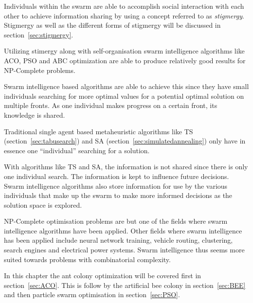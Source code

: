Individuals within the swarm are able to accomplish social interaction with each other to achieve information sharing by using a concept referred to as \emph{stigmergy}\cite{SwarmArt,CompuIntelligenceIntro,FundamentalSwarm}. Stigmergy as well as the different forms of stigmergy will be discussed in section~\ref{sec:stigmergy}.

Utilizing stimergy along with self-organisation swarm intelligence algorithms like ACO, PSO and ABC optimization are able to produce relatively good results for NP-Complete problems\cite{CompuIntelligenceIntro,FundamentalSwarm,SwarmArt}. 

Swarm intelligence based algorithms are able to achieve this since they have small individuals searching for more optimal values for a potential optimal solution on multiple fronts. As one individual makes progress on a certain front, its knowledge is shared\cite{CompuIntelligenceIntro,FundamentalSwarm}. 

Traditional single agent based metaheuristic algorithms like TS (section~\ref{sec:tabusearch}) and SA (section~\ref{sec:simulatedannealing}) only have in essence one ``individual'' searching for a solution\cite{CompuIntelligenceIntro,FundamentalSwarm}. 

With algorithms like TS and SA, the information is not shared since there is only one individual search\cite{CompuIntelligenceIntro,FundamentalSwarm,SASingleMultiObj,TSHazardous}. The information is kept to influence future decisions\cite{AIModernApproach,TabuMontemanniSmith,TabuVechicleRoutingWithTimeWindows,CurveFittingSA,EcoEquilSA}. Swarm intelligence algorithms also store information for use by the various individuals that make up the swarm to make more informed decisions as the solution space is explored\cite{CompuIntelligenceIntro,FundamentalSwarm}.

NP-Complete optimisation problems are but one of the fields where swarm intelligence algorithms have been applied. Other fields where swarm intelligence has been applied include neural network training\cite{CompuIntelligenceIntro}, vehicle routing\cite{ACOSurvey}, clustering\cite{AntSwarmClustering}, search engines and electrical power systems\cite{SAElectricPower}. Swarm intelligence thus seems more suited towards problems with combinatorial complexity\cite{SIOPDenby}.

In this chapter the ant colony optimization will be covered first in section~\ref{sec:ACO}. This is follow by the artificial bee colony in section~\ref{sec:BEE} and then particle swarm optimisation in section~\ref{sec:PSO}.

